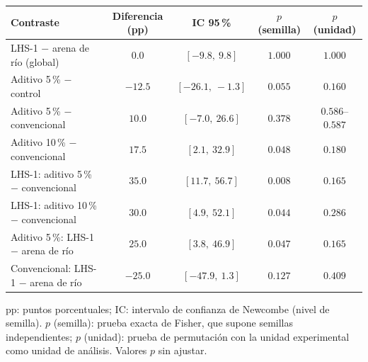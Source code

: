 \begin{tabular}{lcccc}
\hline\hline
\textbf{Contraste} & \textbf{Diferencia (pp)} & \textbf{IC 95\,\%} & \textbf{$p$ (semilla)} & \textbf{$p$ (unidad)} \\
\hline
LHS-1 $-$ arena de r\'io (global) & $0.0$ & $[-9.8,\ 9.8]$ & $1.000$ & $1.000$ \\
Aditivo 5\,\% $-$ control & $-12.5$ & $[-26.1,\ -1.3]$ & $0.055$ & $0.160$ \\
Aditivo 5\,\% $-$ convencional & $10.0$ & $[-7.0,\ 26.6]$ & $0.378$ & $0.586$--$0.587$ \\
Aditivo 10\,\% $-$ convencional & $17.5$ & $[2.1,\ 32.9]$ & $0.048$ & $0.180$ \\
LHS-1: aditivo 5\,\% $-$ convencional & $35.0$ & $[11.7,\ 56.7]$ & $0.008$ & $0.165$ \\
LHS-1: aditivo 10\,\% $-$ convencional & $30.0$ & $[4.9,\ 52.1]$ & $0.044$ & $0.286$ \\
Aditivo 5\,\%: LHS-1 $-$ arena de r\'io & $25.0$ & $[3.8,\ 46.9]$ & $0.047$ & $0.165$ \\
Convencional: LHS-1 $-$ arena de r\'io & $-25.0$ & $[-47.9,\ 1.3]$ & $0.127$ & $0.409$ \\
\hline
\end{tabular}
\par\vspace{4pt}
\parbox{0.94\linewidth}{\footnotesize pp: puntos porcentuales; IC: intervalo de confianza de Newcombe (nivel de semilla). $p$ (semilla): prueba exacta de Fisher, que supone semillas independientes; $p$ (unidad): prueba de permutaci\'on con la unidad experimental como unidad de an\'alisis. Valores $p$ sin ajustar.}
